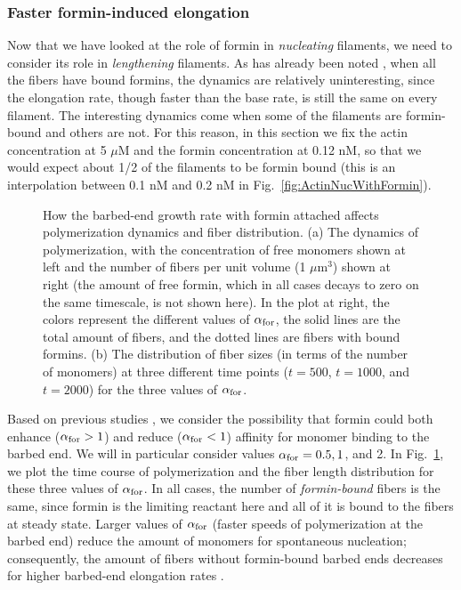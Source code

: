 \documentclass[11pt]{article}
\begin{document}
\subsubsection{Faster formin-induced elongation}
Now that we have looked at the role of formin in \emph{nucleating} filaments, we need to consider its role in \emph{lengthening} filaments. As has already been noted \cite{banerjee2022emergence}, when all the fibers have bound formins, the dynamics are relatively uninteresting, since the elongation rate, though faster than the base rate, is still the same on every filament. The interesting dynamics come when some of the filaments are formin-bound and others are not. For this reason, in this section we fix the actin concentration at 5 $\mu$M and the formin concentration at 0.12 nM, so that we would expect about 1/2 of the filaments to be formin bound (this is an interpolation between 0.1 nM and 0.2 nM in Fig.\ \ref{fig:ActinNucWithFormin}). 

\begin{figure}
\centering
{}
\caption{\label{fig:ForminAlpha}How the barbed-end growth rate with formin attached affects polymerization dynamics and fiber distribution. (a) The dynamics of polymerization, with the concentration of free monomers shown at left and the number of fibers per unit volume (1 $\mu$m$^3$) shown at right (the amount of free formin, which in all cases decays to zero on the same timescale, is not shown here). In the plot at right, the colors represent the different values of $\alpha_\text{for}$, the solid lines are the total amount of fibers, and the dotted lines are fibers with bound formins. (b) The distribution of fiber sizes (in terms of the number of monomers) at three different time points ($t=500$, $t=1000$, and $t=2000$) for the three values of $\alpha_\text{for}$.}
\end{figure}

Based on previous studies \cite{zweifel2021nucleation, funk2019profilin}, we consider the possibility that formin could both enhance ($\alpha_\text{for} > 1$) and reduce ($\alpha_\text{for} < 1$) affinity for monomer binding to the barbed end. We will in particular consider values $\alpha_\text{for}=0.5, 1$, and 2. In Fig.\ \ref{fig:ForminAlpha}, we plot the time course of polymerization and the fiber length distribution for these three values of $\alpha_\text{for}$. In all cases, the number of \emph{formin-bound} fibers is the same, since formin is the limiting reactant here and all of it is bound to the fibers at steady state. Larger values of $\alpha_\text{for}$ (faster speeds of polymerization at the barbed end) reduce the amount of monomers for spontaneous nucleation; consequently, the amount of fibers without formin-bound barbed ends decreases for higher barbed-end elongation rates \cite{banerjee2022emergence}.
\end{document}
